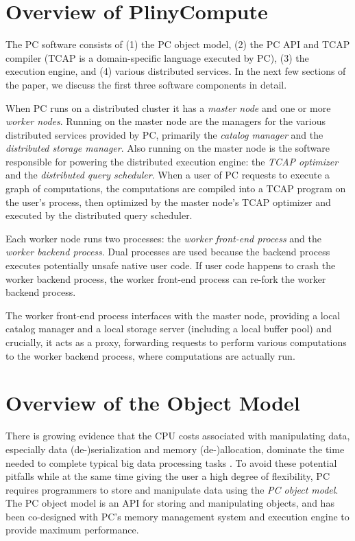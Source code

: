 
\section{Overview of PlinyCompute}


The PC software consists of 
(1) the PC object model, (2) the PC API and TCAP compiler (TCAP is a domain-specific language executed by PC),
(3) the execution engine, and (4) various distributed services. In the next few sections of the paper, we discuss the first three software components in detail.

When PC runs on a distributed cluster it has a \emph{master node} and one or more \emph{worker nodes}.
Running on the master node are the managers for the various distributed services provided by PC, primarily 
the \emph{catalog manager} and the \emph{distributed storage manager}.  Also running on the master
node is the software responsible for powering the distributed execution engine: the \emph{TCAP optimizer} and
the \emph{distributed query scheduler}.  
When a user of PC requests to execute a graph of computations, the
computations are compiled into a TCAP program on the user's process, then optimized
by the master node's TCAP optimizer and executed by the distributed query scheduler.

Each worker node runs two processes: the \emph{worker front-end process} and the \emph{worker backend process}.
Dual processes are used because the backend process
executes potentially unsafe native user code.
If
user code happens to crash the worker backend process, the worker 
front-end process can re-fork the worker
backend process.  

The worker front-end process interfaces with the master node, providing a local catalog manager and a local storage server (including
a local buffer pool)
and crucially, it acts as a proxy, forwarding requests to perform various computations to the worker backend process, where
computations are actually run.



\section{Overview of the Object Model}


There is growing evidence that the CPU costs associated with manipulating data, especially data (de-)serialization and memory 
(de-)allocation,  
dominate the time needed to complete typical big data processing tasks
\cite{ousterhout2015making, shi2015clash, SikdarSoCC2017}.
To avoid these potential pitfalls while at the same time giving the user a high degree of flexibility,
PC requires programmers to store and manipulate data using the \emph{PC object model}.
The PC object model is an API for storing and manipulating objects, and has been co-designed with PC's memory management system and execution engine to provide
maximum performance.  

